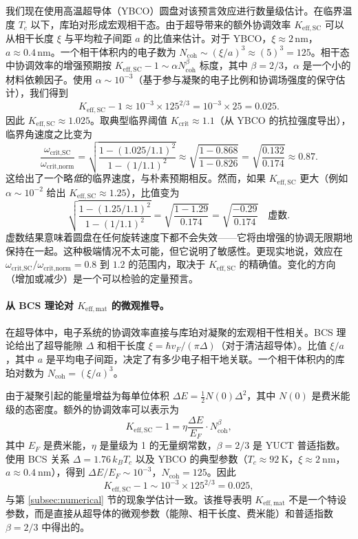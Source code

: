 \documentclass[12pt,a4paper]{article}
\newcommand{\betaf}{\beta}
\begin{document}
	我们现在使用高温超导体（YBCO）圆盘对该预言效应进行数量级估计。在临界温度 \(T_c\) 以下，库珀对形成宏观相干态。由于超导带来的额外协调效率 \(K_{\mathrm{eff,SC}}\) 可以从相干长度 \(\xi\) 与平均粒子间距 \(a\) 的比值来估计。对于 YBCO，\(\xi \approx 2\,\text{nm}\)，\(a \approx 0.4\,\text{nm}\)。一个相干体积内的电子数为 \(N_{\text{coh}} \sim (\xi/a)^3 \approx (5)^3 = 125\)。相干态中协调效率的增强预期按 \(K_{\mathrm{eff,SC}} - 1 \sim \alpha N_{\text{coh}}^{\betaf}\) 标度，其中 \(\betaf = 2/3\)，\(\alpha\) 是一个小的材料依赖因子。使用 \(\alpha \sim 10^{-3}\)（基于参与凝聚的电子比例和协调场强度的保守估计），我们得到
	\[
	K_{\mathrm{eff,SC}} - 1 \approx 10^{-3} \times 125^{2/3} = 10^{-3} \times 25 = 0.025.
	\]
	因此 \(K_{\mathrm{eff,SC}} \approx 1.025\)。取典型临界阈值 \(K_{\mathrm{crit}} \approx 1.1\)（从 YBCO 的抗拉强度导出），临界角速度之比变为
	\[
	\frac{\omega_{\text{crit,SC}}}{\omega_{\text{crit,norm}}} = \sqrt{ \frac{1 - (1.025/1.1)^2}{1 - (1/1.1)^2} } \approx \sqrt{ \frac{1 - 0.868}{1 - 0.826} } = \sqrt{ \frac{0.132}{0.174} } \approx 0.87.
	\]
	这给出了一个略\textit{低}的临界速度，与朴素预期相反。然而，如果 \(K_{\mathrm{eff,SC}}\) 更大（例如 \(\alpha \sim 10^{-2}\) 给出 \(K_{\mathrm{eff,SC}} \approx 1.25\)），比值变为
	\[
	\sqrt{ \frac{1 - (1.25/1.1)^2}{1 - (1/1.1)^2} } = \sqrt{ \frac{1 - 1.29}{0.174} } = \sqrt{ \frac{-0.29}{0.174} } \quad \text{虚数}.
	\]
	虚数结果意味着圆盘在任何旋转速度下都不会失效——它将由增强的协调无限期地保持在一起。这种极端情况不太可能，但它说明了敏感性。更现实地说，效应在 \(\omega_{\text{crit,SC}}/\omega_{\text{crit,norm}} = 0.8\) 到 \(1.2\) 的范围内，取决于 \(K_{\mathrm{eff,SC}}\) 的精确值。变化的方向（增加或减少）是一个可以检验的定量预言。
	
	\paragraph{从 BCS 理论对 \(K_{\mathrm{eff,mat}}\) 的微观推导。}
	在超导体中，电子系统的协调效率直接与库珀对凝聚的宏观相干性相关。BCS 理论给出了超导能隙 \(\Delta\) 和相干长度 \(\xi = \hbar v_F / (\pi \Delta)\)（对于清洁超导体）。比值 \(\xi / a\)，其中 \(a\) 是平均电子间距，决定了有多少电子相干地关联。一个相干体积内的库珀对数为 \(N_{\text{coh}} = (\xi/a)^3\)。
	
	由于凝聚引起的能量增益为每单位体积 \(\Delta E = \frac{1}{2} N(0) \Delta^2\)，其中 \(N(0)\) 是费米能级的态密度。额外的协调效率可以表示为
	\[
	K_{\mathrm{eff,SC}} - 1 = \eta \frac{\Delta E}{E_F} \cdot N_{\text{coh}}^{\beta},
	\]
	其中 \(E_F\) 是费米能，\(\eta\) 是量级为 1 的无量纲常数，\(\beta = 2/3\) 是 YUCT 普适指数。使用 BCS 关系 \(\Delta = 1.76 \, k_B T_c\) 以及 YBCO 的典型参数（\(T_c \approx 92\ \text{K}\)，\(\xi \approx 2\ \text{nm}\)，\(a \approx 0.4\ \text{nm}\)），得到 \(\Delta E/E_F \sim 10^{-3}\)，\(N_{\text{coh}} = 125\)。因此
	\[
	K_{\mathrm{eff,SC}} - 1 \sim 10^{-3} \times 125^{2/3} = 0.025,
	\]
	与第 \ref{subsec:numerical} 节的现象学估计一致。该推导表明 \(K_{\mathrm{eff,mat}}\) 不是一个特设参数，而是直接从超导体的微观参数（能隙、相干长度、费米能）和普适指数 \(\beta = 2/3\) 中得出的。
	
\end{document}
